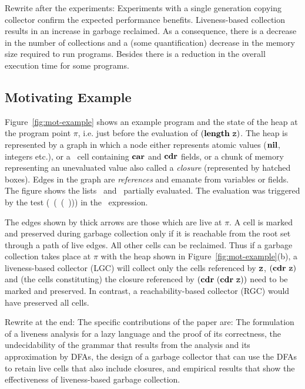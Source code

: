 \documentclass[9pt]{sigplanconf}
\begin{document}
{\color  {Myblue}Rewrite after the experiments:  Experiments  with a
single
  generation  copying  collector   confirm  the  expected  performance
  benefits.   Liveness-based  collection  results  in an  increase  in
  garbage reclaimed.   As a  consequence, there is  a decrease  in the
  number of  collections and a  (some quantification) decrease  in the
  memory size required  to run programs. Besides there  is a reduction
  in the overall execution time for some programs.}


\subsection{Motivating Example}
\label{sec:motiv}

Figure~\ref{fig:mot-example} shows an example program and the state of
the heap at the program point $\pi$, i.e. just before the  evaluation
of $(\length\ \pz)$.  The heap is represented by a graph in which
a node  either represents atomic values ($\mbox{$\mathbf{ nil}$}$,  integers etc.), or
a \CONS\  cell  containing $\mbox{$\mathbf{car}$}$  and  $\mbox{$\mathbf{cdr}$}$  fields, or a chunk of
memory representing an unevaluated
value  also called a  {\em closure}  (represented by  hatched boxes).
Edges in the graph are  {\em references} and emanate from variables or
fields.  The figure shows the lists \px\ and \pz\ partially evaluated.
The evaluation was triggered by the test (\NULLQ~(\CAR~(\CDR~\pz))) in
the \SIF\ expression.


The edges shown by thick arrows  are those which are live at $\pi$.  A
cell is marked  and preserved during garbage collection  only if it is
reachable from the  root set through a path of  live edges.  All other
cells can be  reclaimed.  Thus if a garbage  collection takes place at
$\pi$  with  the  heap  shown  in  Figure~\ref{fig:mot-example}(b),  a
liveness-based collector (LGC) will  collect only the cells referenced
by  $\mbox{\tt z}$, $(\mbox{$\mathbf{cdr}$}~  \mbox{\tt z})$  and (the  cells  constituting) the  closure
referenced by $(\mbox{$\mathbf{cdr}$}~(\mbox{$\mathbf{cdr}$}~\mbox{\tt z}))$ need to be marked and preserved.  In
contrast,  a reachability-based collector  (RGC) would  have preserved
all cells.

{\color {Myblue}Rewrite at the end: The  specific contributions of the
paper
  are: The formulation of a  liveness analysis for a lazy language and
  the proof of its correctness, the undecidability of the grammar that
  results from the analysis and  its approximation by DFAs, the design
  of a  garbage collector that can  use the DFAs to  retain live cells
  that  also include  closures, and  empirical results  that  show the
  effectiveness of liveness-based garbage collection.}
\end{document}
